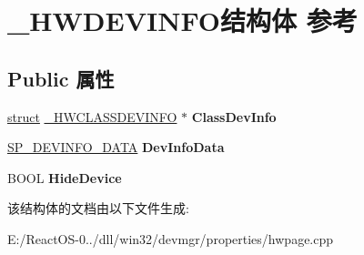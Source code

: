 \hypertarget{struct___h_w_d_e_v_i_n_f_o}{}\section{\+\_\+\+H\+W\+D\+E\+V\+I\+N\+F\+O结构体 参考}
\label{struct___h_w_d_e_v_i_n_f_o}
\subsection*{Public 属性}
\begin{DoxyCompactItemize}
\item 
\mbox{\label{struct___h_w_d_e_v_i_n_f_o_a2b104541057923c17fa4aabc39547e05}} 
\hyperlink{interfacestruct}{struct} \hyperlink{struct___h_w_c_l_a_s_s_d_e_v_i_n_f_o}{\+\_\+\+H\+W\+C\+L\+A\+S\+S\+D\+E\+V\+I\+N\+FO} $\ast$ {\bfseries Class\+Dev\+Info}
\item 
\mbox{\label{struct___h_w_d_e_v_i_n_f_o_aea71c134e7cb4a2db0c3205b900e3327}} 
\hyperlink{struct___s_p___d_e_v_i_n_f_o___d_a_t_a}{S\+P\+\_\+\+D\+E\+V\+I\+N\+F\+O\+\_\+\+D\+A\+TA} {\bfseries Dev\+Info\+Data}
\item 
\mbox{\label{struct___h_w_d_e_v_i_n_f_o_a95af4de976a56e65f29efe1139c3b418}} 
B\+O\+OL {\bfseries Hide\+Device}
\end{DoxyCompactItemize}


该结构体的文档由以下文件生成\+:\begin{DoxyCompactItemize}
\item 
E\+:/\+React\+O\+S-\/0../dll/win32/devmgr/properties/hwpage.\+cpp\end{DoxyCompactItemize}
